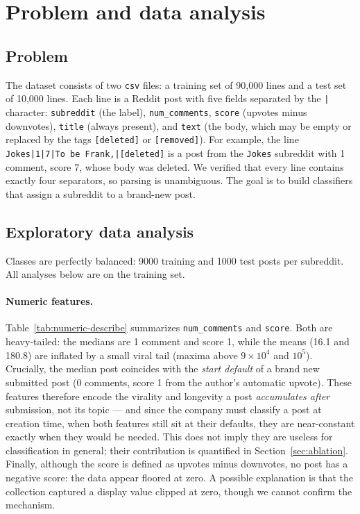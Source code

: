 \documentclass[11pt,a4paper]{article}
\begin{document}
\section{Problem and data analysis}
\label{sec:eda}

\subsection{Problem}
The dataset consists of two \texttt{csv} files: a training set of 90{,}000
lines and a test set of 10{,}000 lines. Each line is a Reddit post with five
fields separated by the \texttt{|} character: \texttt{subreddit} (the label),
\texttt{num\_comments}, \texttt{score} (upvotes minus downvotes),
\texttt{title} (always present), and \texttt{text} (the body, which may be
empty or replaced by the tags \texttt{[deleted]} or \texttt{[removed]}).
For example, the line \texttt{Jokes|1|7|To be Frank,|[deleted]} is a post from
the \texttt{Jokes} subreddit with 1 comment, score 7, whose body was deleted.
We verified that every line contains exactly four separators, so parsing is
unambiguous. The goal is to build classifiers that assign a subreddit to a
brand-new post.

\subsection{Exploratory data analysis}
\label{subsec:eda}
Classes are perfectly balanced: 9000 training and 1000 test posts per
subreddit. All analyses below are on the training set.

\paragraph{Numeric features.}
Table~\ref{tab:numeric-describe} summarizes \texttt{num\_comments} and
\texttt{score}. Both are heavy-tailed: the medians are 1 comment and score 1,
while the means (16.1 and 180.8) are inflated by a small viral tail (maxima
above $9\times10^4$ and $10^5$). Crucially, the median post coincides with the
\emph{start default} of a brand new submitted post (0 comments, score 1
from the author's automatic upvote). These features therefore encode the
virality and longevity a post \emph{accumulates after} submission, not its
topic --- and since the company must classify a post at creation time, when
both features still sit at their defaults, they are near-constant exactly when
they would be needed. This does not imply they are useless for classification
in general; their contribution is quantified in
Section~\ref{sec:ablation}. Finally, although the score is defined as upvotes
minus downvotes, no post has a negative score: the data appear floored at
zero. A possible explanation is that the collection captured a display value
clipped at zero, though we cannot confirm the mechanism.
\end{document}
